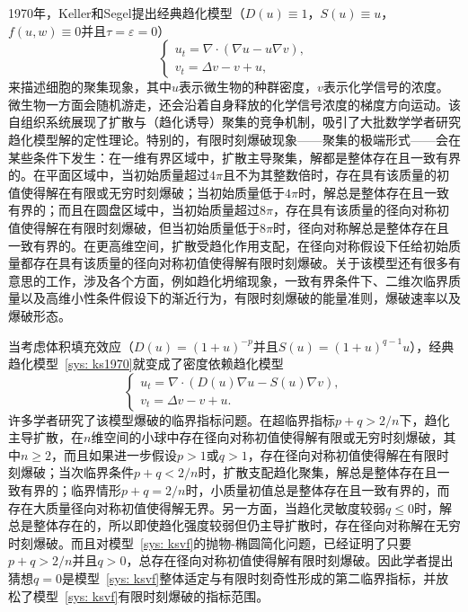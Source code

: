 \documentclass[12pt]{article}
\begin{document}
1970年，Keller和Segel提出经典趋化模型（$D(u)\equiv1$，$S(u)\equiv u$，$f(u,w)\equiv0$并且$\tau=\varepsilon=0$）
\begin{equation}
    \label{sys: ks1970}
    \begin{cases}
        u_t = \nabla \cdot(\nabla u - u\nabla v), \\ 
        v_t = \Delta v - v + u,
    \end{cases}
\end{equation} 
来描述细胞的聚集现象，其中$u$表示微生物的种群密度，$v$表示化学信号的浓度\cite{Keller1970}。微生物一方面会随机游走，还会沿着自身释放的化学信号浓度的梯度方向运动。该自组织系统展现了扩散与（趋化诱导）聚集的竞争机制，吸引了大批数学学者研究趋化模型解的定性理论。特别的，有限时刻爆破现象——聚集的极端形式——会在某些条件下发生：在一维有界区域中，扩散主导聚集，解都是整体存在且一致有界的\cite{Osaki2001}。在平面区域中，当初始质量超过$4\pi$且不为其整数倍时，存在具有该质量的初值使得解在有限或无穷时刻爆破\cite{Horstmann2001}；当初始质量低于$4\pi$时，解总是整体存在且一致有界的\cite{Nagai1997}；而且在圆盘区域中，当初始质量超过$8\pi$，存在具有该质量的径向对称初值使得解在有限时刻爆破\cite{Mizoguchi2014}，但当初始质量低于$8\pi$时，径向对称解总是整体存在且一致有界的\cite{Nagai1997}。在更高维空间，扩散受趋化作用支配，在径向对称假设下任给初始质量都存在具有该质量的径向对称初值使得解有限时刻爆破\cite{Winkler2013}。关于该模型还有很多有意思的工作，涉及各个方面，例如趋化坍缩现象\cite{Nagai2000}，一致有界条件下\cite{Feireisl2007}、二维次临界质量\cite{Wang2019}以及高维小性条件假设下\cite{Cao2015}的渐近行为，有限时刻爆破的能量准则\cite{Mizoguchi2020}，爆破速率\cite{Mizoguchi2020a}以及爆破形态\cite{Winkler2020}。

当考虑体积填充效应\cite{Painter2002}（$D(u) = (1+u)^{-p}$并且$S(u)=(1+u)^{q-1}u$），经典趋化模型~\eqref{sys: ks1970}就变成了密度依赖趋化模型
\begin{equation}
    \label{sys: ksvf}
    \begin{cases}
        u_t = \nabla \cdot(D(u)\nabla u - S(u)\nabla v), \\ 
        v_t = \Delta v - v + u.
    \end{cases}
\end{equation} 
许多学者研究了该模型爆破的临界指标问题。在超临界指标$p+q>2/n$下，趋化主导扩散，在$n$维空间的小球中存在径向对称初值使得解有限或无穷时刻爆破\cite{Winkler2010}，其中$n\geq2$，而且如果进一步假设$p>1$或$q>1$，存在径向对称初值使得解在有限时刻爆破\cite{Winkler2010a}；当次临界条件$p+q<2/n$时，扩散支配趋化聚集，解总是整体存在且一致有界的\cite{Tao2012}；临界情形$p+q=2/n$时，小质量初值总是整体存在且一致有界的，而存在大质量径向对称初值使得解无界\cite{Winkler2022}。另一方面，当趋化灵敏度较弱$q\leq0$时，解总是整体存在的，所以即使趋化强度较弱但仍主导扩散时，存在径向对称解在无穷时刻爆破\cite{Winkler2019}。而且对模型~\eqref{sys: ksvf}的抛物-椭圆简化问题，已经证明了只要$p+q>2/n$并且$q>0$，总存在径向对称初值使得解有限时刻爆破\cite{Winkler2010b}。因此学者提出猜想$q=0$是模型~\eqref{sys: ksvf}整体适定与有限时刻奇性形成的第二临界指标，并放松了模型~\eqref{sys: ksvf}有限时刻爆破的指标范围\cite{Cao2025}。
\end{document}
